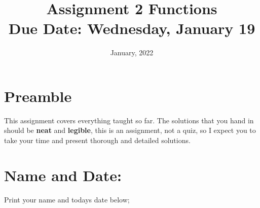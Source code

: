 \documentclass[12pt]{article} %
\title{\textbf{Assignment 2 Functions} \\ \textbf{Due Date: } Wednesday, January 19}
\date{January, 2022}
\begin{document}
	\renewcommand*{\coursecode}{MATH 235} %
	\renewcommand*{\assgnnumber}{Assignment 1} %
	\renewcommand*{\submdate}{September 14, 2021} %
	\renewcommand*{\studentfname}{Abdullah} %
	\renewcommand*{\studentlname}{Zubair} %
    \renewcommand*{\proofname}{Proof:}

	\renewcommand\qedsymbol{$\blacksquare$}
	\setfigpath
	\fancyhfoffset[L,O]{0pt} %



\maketitle
	\section{Preamble}
  This assignment covers everything taught so far. The solutions that you hand in should be \textbf{neat} and \textbf{legible},
  this is an assignment, not a quiz, so I expect you to take your time and present thorough and detailed solutions.
\section{Name and Date:}
	Print your name and todays date below;\\
\end{document}
